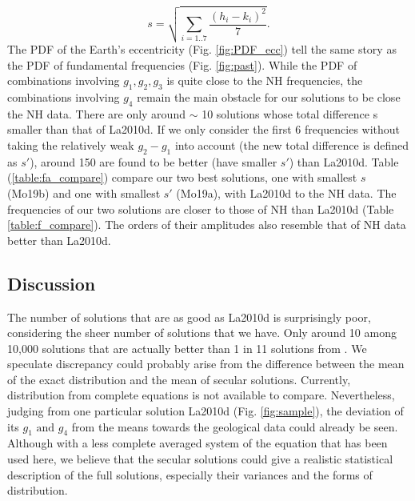\documentclass[12pt]{article}
\begin{document}
	\begin{equation} \label{eq:s}
	s = \sqrt{\sum_{i=1..7}^{} \frac{(h_i-k_i)^2}{7}}.
	\end{equation}
	The PDF of the Earth's eccentricity (Fig. \ref{fig:PDF_ecc}) tell the same story as the PDF of fundamental frequencies (Fig. \ref{fig:past}). While the PDF of combinations involving $g_1, g_2, g_3$ is quite close to the NH frequencies, the combinations involving $g_4$ remain the main obstacle for our solutions to be close the NH data. There are only around $\sim$ 10 solutions whose total difference s smaller than that of La2010d. If we only consider the first 6 frequencies without taking the relatively weak $g_2 - g_1$ into account (the new total difference is defined as $s'$), around 150 are found to be better (have smaller $s'$) than La2010d. Table (\ref{table:fa_compare}) compare our two best solutions, one with smallest $s$ (Mo19b) and one with smallest $s'$ (Mo19a), with La2010d to the NH data. The frequencies of our two solutions are closer to those of NH than La2010d (Table \ref{table:f_compare}). The orders of their amplitudes also resemble that of NH data better than La2010d. 
	
	

	\subsection{Discussion}
	The number of solutions that are as good as La2010d is surprisingly poor, considering the sheer number of solutions that we have. Only around 10 among 10,000 solutions that are actually better than 1 in 11 solutions from \cite{olsen2019}. We speculate discrepancy could probably arise from the difference between the mean of the exact distribution and the mean of secular solutions. Currently, distribution from complete equations is not available to compare. Nevertheless, judging from one particular solution La2010d (Fig. \ref{fig:sample}), the deviation of its  $g_1 \text{ and }g_4$ from the means towards the geological data could already be seen. Although with a less complete averaged system of the equation that has been used here, we believe that the secular solutions could give a realistic statistical description of the full solutions, especially their variances and the forms of distribution.
	
\end{document}
